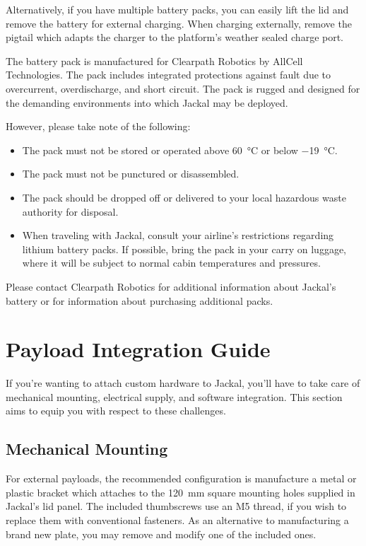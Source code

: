 \documentclass[]{clearpath-latex/clearpath-manual}
\begin{document}
Alternatively, if you have multiple battery packs, you can easily lift the lid and
remove the battery for external charging. When charging externally, remove the pigtail
which adapts the charger to the platform's weather sealed charge port.

The battery pack is manufactured for Clearpath Robotics by AllCell Technologies. The
pack includes integrated protections against fault due to overcurrent, overdischarge,
and short circuit. The pack is rugged and designed for the demanding environments into
which Jackal may be deployed.

However, please take note of the following:

\begin{itemize}
\item The pack must not be stored or operated above \SI{60}{\celsius} or below \SI{-19}{\celsius}.
\item The pack must not be punctured or disassembled.
\item The pack should be dropped off or delivered to your local hazardous waste authority for disposal.
\item When traveling with Jackal, consult your airline's restrictions regarding lithium
battery packs. If possible, bring the pack in your carry on luggage, where it will
be subject to normal cabin temperatures and pressures.
\end{itemize}

Please contact Clearpath Robotics for additional information about Jackal's battery or
for information about purchasing additional packs.


\section{Payload Integration Guide}

If you're wanting to attach custom hardware to Jackal, you'll have to take care of
mechanical mounting, electrical supply, and software integration. This section
aims to equip you with respect to these challenges.


\subsection{Mechanical Mounting}

For external payloads, the recommended configuration is manufacture a metal or plastic bracket
which attaches to the \SI{120}{\mm} square mounting holes supplied in Jackal's lid
panel. The included thumbscrews use an M5 thread, if you wish to replace them with conventional
fasteners. As an alternative to manufacturing a brand new plate, you may remove and modify one
of the included ones.
\end{document}
